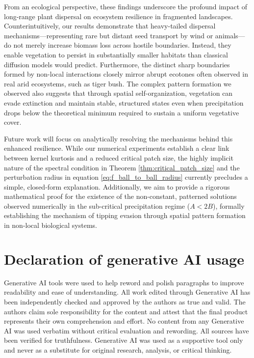 \documentclass[11pt, a4paper]{article}
\theoremstyle{break}
\theoremstyle{break}
\theoremstyle{break}
\theoremstyle{break}
\theoremstyle{break}
\theoremstyle{break}
\theoremstyle{break}
\theoremstyle{break}
\theoremstyle{break}
\theoremstyle{break}
\begin{document}
From an ecological perspective, these findings underscore the profound impact of long-range plant dispersal on ecosystem resilience in fragmented landscapes. Counterintuitively, our results demonstrate that heavy-tailed dispersal mechanisms---representing rare but distant seed transport by wind or animals---do not merely increase biomass loss across hostile boundaries. Instead, they enable vegetation to persist in substantially smaller habitats than classical diffusion models would predict. Furthermore, the distinct sharp boundaries formed by non-local interactions closely mirror abrupt ecotones often observed in real arid ecosystems, such as tiger bush. The complex pattern formation we observed also suggests that through spatial self-organization, vegetation can evade extinction and maintain stable, structured states even when precipitation drops below the theoretical minimum required to sustain a uniform vegetative cover.

Future work will focus on analytically resolving the mechanisms behind this enhanced resilience. While our numerical experiments establish a clear link between kernel kurtosis and a reduced critical patch size, the highly implicit nature of the spectral condition in Theorem \ref{thm:critical_patch_size} and the perturbation radius in equation \eqref{eq:f_ball_to_ball_radius} currently precludes a simple, closed-form explanation. Additionally, we aim to provide a rigorous mathematical proof for the existence of the non-constant, patterned solutions observed numerically in the sub-critical precipitation regime ($A < 2B$), formally establishing the mechanism of tipping evasion through spatial pattern formation in non-local biological systems.

\section*{Declaration of generative AI usage}
Generative AI tools were used to help reword and polish paragraphs to improve readability and ease of understanding. All work edited through Generative AI has been independently checked and approved by the authors as true and valid. The authors claim sole responsibility for the content and attest that the final product represents their own comprehension and effort. No content from any Generative AI was used verbatim without critical evaluation and rewording. All sources have been verified for truthfulness. Generative AI was used as a supportive tool only and never as a substitute for original research, analysis, or critical thinking.
\end{document}
